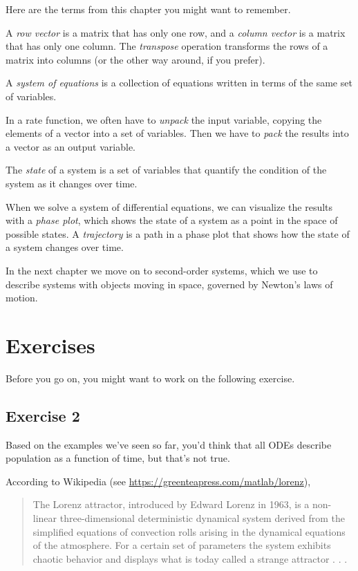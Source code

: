 Here are the terms from this chapter you might want to remember.

A {\em row vector} is a matrix that has only one row, and a {\em column vector} is a matrix that has only one column.
The {\em transpose} operation transforms the rows of a matrix
into columns (or the other way around, if you prefer).

A {\em system of equations} is a collection of equations written in terms of
the same set of variables.

In a rate function, we often have to {\em unpack} the input variable,
copying the elements of a vector into a set of variables.
Then we have to {\em pack} the results into a vector as an output variable.

The {\em state} of a system is a set of variables that quantify the condition of the system as it changes over time.

When we solve a system of differential equations, we can visualize the results with a {\em phase plot}, which shows the state of a system as a point in the space of possible states.
A {\em trajectory} is a path in a phase plot that shows how the state of a system changes over time.

In the next chapter we move on to second-order systems, which we use to describe systems
with objects moving in space, governed by Newton's laws of motion.


\section{Exercises}

Before you go on, you might want to work on the following exercise.

\subsection{Exercise 2}


Based on the examples we've seen so far, you'd think that all ODEs describe population as
a function of time, but that's not true.

According to Wikipedia (see \url{https://greenteapress.com/matlab/lorenz}),
\begin{quote}
The Lorenz attractor, introduced by Edward Lorenz in 1963, is a
non-linear three-dimensional deterministic dynamical system derived
from the simplified equations of convection rolls arising in the
dynamical equations of the atmosphere. For a certain set of parameters
the system exhibits chaotic behavior and displays what is today called
a strange attractor . . .
\end{quote}

